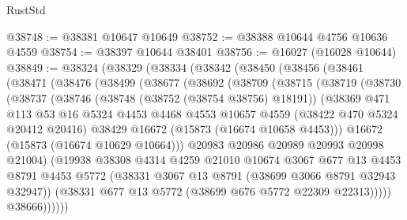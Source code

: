 \begin{lexlean}{RustStd}
\begin{coremodule}
@38748 := @38381 @10647 @10649
@38752 := @38388 @10644 @4756 @10636 @4559
@38754 := @38397 @10644 @38401
@38756 := @16027 (@16028 @10644)
@38849 := @38324
    (@38329
      (@38334
        (@38342
          (@38450
            (@38456
              (@38461
                (@38471
                  (@38476
                    (@38499
                      (@38677
                        (@38692
                          (@38709
                            (@38715
                              (@38719
                                (@38730
                                  (@38737
                                    (@38746
                                      (@38748 (@38752 (@38754 @38756) @18191))
                                      (@38369
                                        @471
                                        @113
                                        @53
                                        @16
                                        @5324
                                        @4453
                                        @4468
                                        @4553
                                        @10657
                                        @4559
                                        (@38422 @470 @5324 @20412 @20416)
                                        @38429
                                        @16672
                                        (@15873 (@16674 @10658 @4453)))
                                      @16672
                                      (@15873 (@16674 @10629 @10664)))
                                    @20983
                                    @20986
                                    @20989
                                    @20993
                                    @20998
                                    @21004)
                                  (@19938
                                    @38308
                                    @4314
                                    @4259
                                    @21010
                                    @10674
                                    @3067
                                    @677
                                    @13
                                    @4453
                                    @8791
                                    @4453
                                    @5772
                                    (@38331 @3067 @13 @8791 (@38699 @3066 @8791 @32943 @32947))
                                    (@38331 @677 @13 @5772 (@38699 @676 @5772 @22309 @22313)))))
                              @38666))))))

\end{coremodule}
\end{lexlean}
